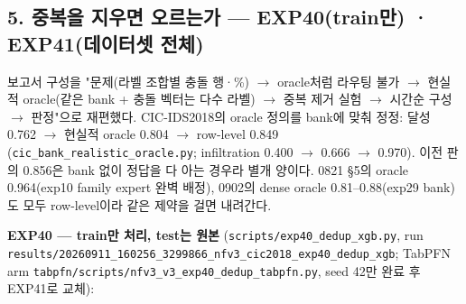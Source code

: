 \subsection{5. 중복을 지우면 오르는가 — EXP40(train만) · EXP41(데이터셋 전체)}
보고서 구성을 "문제(라벨 조합별 충돌 행·\%)  \ensuremath{\rightarrow}  oracle처럼 라우팅 불가  \ensuremath{\rightarrow}  현실적 oracle(같은 bank +\allowbreak{} 충돌 벡터는 다수 라벨)  \ensuremath{\rightarrow}  중복 제거 실험  \ensuremath{\rightarrow}  시간순 구성  \ensuremath{\rightarrow}  판정"으로 재편했다. CIC-IDS2018의 oracle 정의를 bank에 맞춰 정정: 달성 0.762  \ensuremath{\rightarrow}  현실적 oracle 0.804  \ensuremath{\rightarrow}  row-level 0.849 (\texttt{cic\_\allowbreak{}\allowbreak{}bank\allowbreak{}\_\allowbreak{}\allowbreak{}realist\allowbreak{}ic\_\allowbreak{}\allowbreak{}oracl\allowbreak{}e.\allowbreak{}py}; infiltration 0.400  \ensuremath{\rightarrow}  0.666  \ensuremath{\rightarrow}  0.970). 이전 판의 0.856은 bank 없이 정답을 다 아는 경우라 별개 양이다. 0821 §5의 oracle 0.964(exp10 family expert 완벽 배정), 0902의 dense oracle 0.81–0.88(exp29 bank)도 모두 row-level이라 같은 제약을 걸면 내려간다.

\textbf{EXP40 — train만 처리, test는 원본} (\texttt{scripts/\allowbreak{}\allowbreak{}exp40\_\allowbreak{}\allowbreak{}de\allowbreak{}dup\_\allowbreak{}\allowbreak{}xgb.\allowbreak{}py}, run \texttt{results/\allowbreak{}\allowbreak{}20260911\allowbreak{}\_\allowbreak{}\allowbreak{}160256\_\allowbreak{}\allowbreak{}3299866\_\allowbreak{}\allowbreak{}nfv3\_\allowbreak{}\allowbreak{}cic\allowbreak{}2018\_\allowbreak{}\allowbreak{}exp\allowbreak{}40\_\allowbreak{}\allowbreak{}dedup\allowbreak{}\_\allowbreak{}\allowbreak{}xgb}; TabPFN arm \texttt{tabpfn/\allowbreak{}\allowbreak{}s\allowbreak{}cripts/\allowbreak{}\allowbreak{}n\allowbreak{}fv3\_\allowbreak{}\allowbreak{}v3\_\allowbreak{}\allowbreak{}e\allowbreak{}xp40\_\allowbreak{}\allowbreak{}ded\allowbreak{}up\_\allowbreak{}\allowbreak{}tabpf\allowbreak{}n.\allowbreak{}py}, seed 42만 완료 후 EXP41로 교체):

